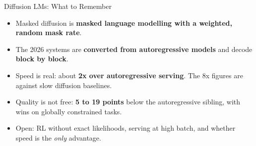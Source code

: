 \begin{frame}{Diffusion LMs: What to Remember}
    \begin{itemize}\itemsep0.55em
        \item Masked diffusion is \textbf{masked language modelling with a weighted, random mask rate}.
        \item The 2026 systems are \textbf{converted from autoregressive models} and decode \textbf{block by block}.
        \item Speed is real: about \textbf{2x over autoregressive serving}. The 8x figures are against slow diffusion baselines.
        \item Quality is not free: \textbf{5 to 19 points} below the autoregressive sibling, with wins on globally constrained tasks.
        \item Open: RL without exact likelihoods, serving at high batch, and whether speed is the \emph{only} advantage.
    \end{itemize}
    \vspace{0.4em}
\end{frame}
